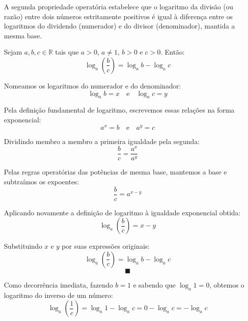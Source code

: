 \documentclass[12pt,a4paper]{report}
\begin{document}
	A segunda propriedade operatória estabelece que o logaritmo da divisão (ou razão) entre dois números estritamente positivos é igual à diferença entre os logaritmos do dividendo (numerador) e do divisor (denominador), mantida a mesma base.
	
	\begin{destaque}
		Sejam $a, b, c \in \mathbb{R}$ tais que $a > 0$, $a \neq 1$, $b > 0$ e $c > 0$. Então:
		$$\log_a \left(\frac{b}{c}\right) = \log_a b - \log_a c$$
	\end{destaque}
	
	\begin{destaque}[Demonstração]
		Nomeamos os logaritmos do numerador e do denominador:
		$$\log_a b = x \quad \text{e} \quad \log_a c = y$$
		
		Pela definição fundamental de logaritmo, escrevemos essas relações na forma exponencial:
		$$a^x = b \quad \text{e} \quad a^y = c$$
		
		Dividindo membro a membro a primeira igualdade pela segunda:
		$$\frac{b}{c} = \frac{a^x}{a^y}$$
		
		Pelas regras operatórias das potências de mesma base, mantemos a base e subtraímos os expoentes:
		$$\frac{b}{c} = a^{x - y}$$
		
		Aplicando novamente a definição de logaritmo à igualdade exponencial obtida:
		$$\log_a \left(\frac{b}{c}\right) = x - y$$
		
		Substituindo $x$ e $y$ por suas expressões originais:
		$$\log_a \left(\frac{b}{c}\right) = \log_a b - \log_a c$$
		$$\blacksquare$$
	\end{destaque}
	
	\begin{destaque}
		Como decorrência imediata, fazendo $b = 1$ e sabendo que $\log_a 1 = 0$, obtemos o logaritmo do inverso de um número:
		$$\log_a \left(\frac{1}{c}\right) = \log_a 1 - \log_a c = 0 - \log_a c = -\log_a c$$
	\end{destaque}
	
\end{document}
